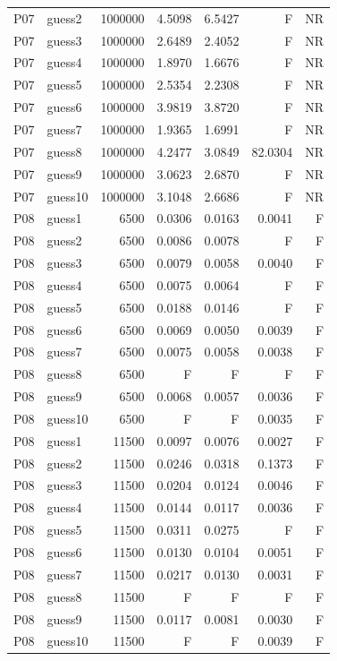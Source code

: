 {\begin{longtable}{llrrrrr}
P07 & guess2 & 1000000 & 4.5098 & 6.5427 & F & NR \\
P07 & guess3 & 1000000 & 2.6489 & 2.4052 & F & NR \\
P07 & guess4 & 1000000 & 1.8970 & 1.6676 & F & NR \\
P07 & guess5 & 1000000 & 2.5354 & 2.2308 & F & NR \\
P07 & guess6 & 1000000 & 3.9819 & 3.8720 & F & NR \\
P07 & guess7 & 1000000 & 1.9365 & 1.6991 & F & NR \\
P07 & guess8 & 1000000 & 4.2477 & 3.0849 & 82.0304 & NR \\
P07 & guess9 & 1000000 & 3.0623 & 2.6870 & F & NR \\
P07 & guess10 & 1000000 & 3.1048 & 2.6686 & F & NR \\
P08 & guess1 & 6500 & 0.0306 & 0.0163 & 0.0041 & F \\
P08 & guess2 & 6500 & 0.0086 & 0.0078 & F & F \\
P08 & guess3 & 6500 & 0.0079 & 0.0058 & 0.0040 & F \\
P08 & guess4 & 6500 & 0.0075 & 0.0064 & F & F \\
P08 & guess5 & 6500 & 0.0188 & 0.0146 & F & F \\
P08 & guess6 & 6500 & 0.0069 & 0.0050 & 0.0039 & F \\
P08 & guess7 & 6500 & 0.0075 & 0.0058 & 0.0038 & F \\
P08 & guess8 & 6500 & F & F & F & F \\
P08 & guess9 & 6500 & 0.0068 & 0.0057 & 0.0036 & F \\
P08 & guess10 & 6500 & F & F & 0.0035 & F \\
P08 & guess1 & 11500 & 0.0097 & 0.0076 & 0.0027 & F \\
P08 & guess2 & 11500 & 0.0246 & 0.0318 & 0.1373 & F \\
P08 & guess3 & 11500 & 0.0204 & 0.0124 & 0.0046 & F \\
P08 & guess4 & 11500 & 0.0144 & 0.0117 & 0.0036 & F \\
P08 & guess5 & 11500 & 0.0311 & 0.0275 & F & F \\
P08 & guess6 & 11500 & 0.0130 & 0.0104 & 0.0051 & F \\
P08 & guess7 & 11500 & 0.0217 & 0.0130 & 0.0031 & F \\
P08 & guess8 & 11500 & F & F & F & F \\
P08 & guess9 & 11500 & 0.0117 & 0.0081 & 0.0030 & F \\
P08 & guess10 & 11500 & F & F & 0.0039 & F \\

\end{longtable}}
